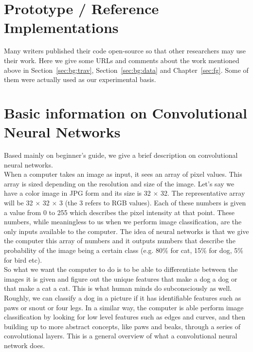 \documentclass[12pt,a4paper]{report}
\newcommand{\acronym}{\MakeUppercase}
\begin{document}
	
	\appendix
	\chapter{Prototype / Reference Implementations}
	\label{app:impl}
	
	Many writers published their code open-source so that other researchers may 
	use their work. Here we give some \acronym{url}s and comments about the work 
	mentioned above in Section~\ref{sec:bg:trav}, Section~\ref{sec:bg:data} and 
	Chapter~\ref{sec:fg}. Some of them were actually used as our experimental basis.
	\\
	
	\begin{table}[h]
		\centering	
			
	\end{table}
	
	
	\chapter{Basic information on Convolutional Neural Networks}
	\label{app:conv}
	
	Based mainly on \citet{Deshpande_guide} beginner's guide, we give a brief 
	description on convolutional neural networks.
	\\
	
	When a computer takes an image as input, it sees an array of pixel values. This 
	array is sized depending on the resolution and size of the image. Let's say we 
	have a color image in \acronym{jpg} form and its size is 32 $\times$ 32. The 
	representative array will be 32 $\times$ 32 $\times$ 3 (the 3 refers to \acronym{rgb} 
	values). Each of these numbers is given a value from 0 to 255 which describes the 
	pixel intensity at that point. These numbers, while meaningless to us when we 
	perform image classification, are the only inputs available to the computer. The 
	idea of neural networks is that we give the computer this array of numbers and 
	it outputs numbers that describe the probability of the image being a certain 
	class (e.g. 80\% for cat, 15\% for dog, 5\% for bird etc).
	\\
	
	So what we want the computer to do is to be able to differentiate between the 
	images it is given and figure out the unique features that make a dog a dog or 
	that make a cat a cat. This is what human minds do subconsciously as well. Roughly,
	we can classify a dog in a picture if it has identifiable features such as paws or 
	snout or four legs. In a similar way, the computer is able perform image 
	classification by looking for low level features such as edges and curves, and 
	then building up to more abstract concepts, like paws and beaks, through a series 
	of convolutional layers. This is a general overview of what a convolutional neural 
	network does.
	\\
	
\end{document}
